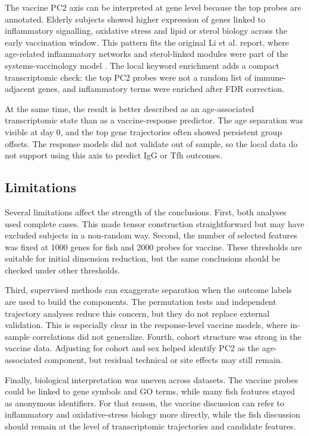 \documentclass[11pt,a4paper]{article}
\begin{document}
The vaccine PC2 axis can be interpreted at gene level because the top probes are annotated. Elderly subjects showed higher expression of genes linked to inflammatory signalling, oxidative stress and lipid or sterol biology across the early vaccination window. This pattern fits the original Li et al. report, where age-related inflammatory networks and sterol-linked modules were part of the systems-vaccinology model \citep{li2017vaccine}. The local keyword enrichment adds a compact transcriptomic check: the top PC2 probes were not a random list of immune-adjacent genes, and inflammatory terms were enriched after FDR correction.

At the same time, the result is better described as an age-associated transcriptomic state than as a vaccine-response predictor. The age separation was visible at day 0, and the top gene trajectories often showed persistent group offsets. The response models did not validate out of sample, so the local data do not support using this axis to predict IgG or Tfh outcomes.

\subsection{Limitations}

Several limitations affect the strength of the conclusions. First, both analyses used complete cases. This made tensor construction straightforward but may have excluded subjects in a non-random way. Second, the number of selected features was fixed at 1000 genes for fish and 2000 probes for vaccine. These thresholds are suitable for initial dimension reduction, but the same conclusions should be checked under other thresholds.

Third, supervised methods can exaggerate separation when the outcome labels are used to build the components. The permutation tests and independent trajectory analyses reduce this concern, but they do not replace external validation. This is especially clear in the response-level vaccine models, where in-sample correlations did not generalize. Fourth, cohort structure was strong in the vaccine data. Adjusting for cohort and sex helped identify PC2 as the age-associated component, but residual technical or site effects may still remain.

Finally, biological interpretation was uneven across datasets. The vaccine probes could be linked to gene symbols and GO terms, while many fish features stayed as anonymous identifiers. For that reason, the vaccine discussion can refer to inflammatory and oxidative-stress biology more directly, while the fish discussion should remain at the level of transcriptomic trajectories and candidate features.
\end{document}
